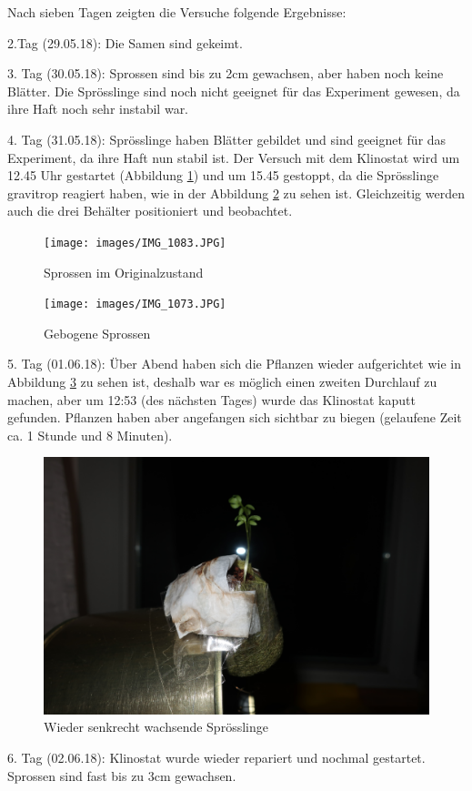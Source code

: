 \documentclass[
a4paper, 
11pt, 
ngerman,
listof=totoc,
bibliography=totocnumbered,
abstracton
]{scrreprt}
\begin{document}
Nach sieben Tagen zeigten die Versuche folgende Ergebnisse:

2.Tag (29.05.18): Die Samen sind gekeimt. 

3. Tag (30.05.18): Sprossen sind bis zu 2cm gewachsen, aber haben noch keine Blätter. Die Sprösslinge sind noch nicht geeignet für das Experiment gewesen, da ihre Haft noch sehr instabil war.

4. Tag (31.05.18): Sprösslinge haben Blätter gebildet und sind geeignet für das Experiment, da ihre Haft nun stabil ist. Der Versuch mit dem Klinostat wird um 12.45 Uhr gestartet (Abbildung \ref{Foto 1}) und um 15.45 gestoppt, da die Sprösslinge gravitrop reagiert haben, wie in der Abbildung \ref{Foto 2} zu sehen ist. Gleichzeitig werden auch die drei Behälter positioniert und beobachtet.

\begin{figure}[H]
	  \centering 
	  \texttt{[image: images/IMG\_1083.JPG]}
	  \caption{Sprossen im Originalzustand \label{Foto 1}}
\end{figure}


\begin{figure}[H]
	  \centering 
	  \texttt{[image: images/IMG\_1073.JPG]}
	  \caption{Gebogene Sprossen \label{Foto 2}}
\end{figure}



5. Tag (01.06.18): Über Abend haben sich die Pflanzen wieder aufgerichtet wie in Abbildung \ref{Foto 3} zu sehen ist, deshalb war es möglich einen zweiten Durchlauf zu machen, aber um 12:53 (des nächsten Tages) wurde das Klinostat kaputt gefunden. Pflanzen haben aber angefangen sich sichtbar zu biegen (gelaufene Zeit ca. 1 Stunde und 8 Minuten).

\begin{figure}[H]
	\centering 
	\includegraphics[width = .4\linewidth]{images/IMG_1114.JPG}
	\caption{Wieder senkrecht wachsende Sprösslinge \label{Foto 3}}
\end{figure}

6. Tag (02.06.18): Klinostat wurde wieder repariert und nochmal gestartet. Sprossen sind fast bis zu 3cm gewachsen.
\end{document}
